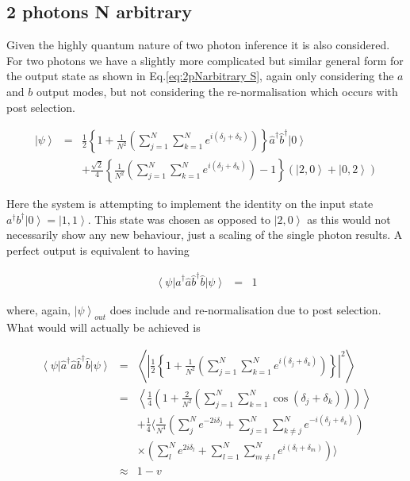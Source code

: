 \documentclass[aps,pra,twocolumn,superscriptaddress,numerical]{revtex4-1}
\begin{document}
	\subsection{2 photons N arbitrary \label{2 photons N arbitrary}}
	
		Given the highly quantum nature of two photon inference it is also considered. For two photons we have a slightly more complicated but similar general form for the output state as shown in Eq.\ref{eq:2pNarbitrary S}, again only considering the $a$ and $b$ output modes, but not considering the re-normalisation which occurs with post selection.
		
		\begin{widetext}
			\begin{eqnarray}
				\left|\psi\right\rangle & = & \frac{1}{2}\left\{ 1+\frac{1}{N^{2}}\left(\sum_{j=1}^{N}\sum_{k=1}^{N}e^{i(\delta_{j}+\delta_{k})}\right)\right\} \hat{a}^{\dagger}\hat{b}^{\dagger}\left|0\right\rangle \nonumber \\
			 	& & +\frac{\sqrt{2}}{4}\left\{ \frac{1}{N^{2}}\left(\sum_{j=1}^{N}\sum_{k=1}^{N}e^{i(\delta_{j}+\delta_{k})}\right)-1\right\} \left(\left|2,0\right\rangle +\left|0,2\right\rangle \right)\label{eq:2pNarbitrary S}
			\end{eqnarray}
		\end{widetext}
		
		Here the system is attempting to implement the identity on the input state $a^{\dagger}b^{\dagger}\left|0\right\rangle =\left|1,1\right\rangle $. This state was chosen as opposed to $\left|2,0\right\rangle $ as this would not necessarily show any new behaviour, just a scaling of the single photon results. A perfect output is equivalent to having
		
		\begin{eqnarray}
			\left\langle \psi\right|\hat{a}^{\dagger}\hat{a}\hat{b}^{\dagger}\hat{b}\left|\psi\right\rangle & = & 1
		\end{eqnarray}
		
		
		where, again, $\left|\psi\right\rangle _{out}$ does include and re-normalisation due to post selection. What would will actually be achieved is
		
		\begin{eqnarray}
			\left\langle \psi\right|\hat{a}^{\dagger}\hat{a}\hat{b}^{\dagger}\hat{b}\left|\psi\right\rangle & = & \left\langle \left|\frac{1}{2}\left\{ 1+\frac{1}{N^{2}}\left(\sum_{j=1}^{N}\sum_{k=1}^{N}e^{i(\delta_{j}+\delta_{k})}\right)\right\} \right|^{2}\right\rangle \nonumber \\
			& = & \left\langle \frac{1}{4}\left(1+\frac{2}{N^{2}}\left(\sum_{j=1}^{N}\sum_{k=1}^{N}\cos\left(\delta_{j}+\delta_{k}\right)\right)\right)\right\rangle \nonumber \\
			&  & +\frac{1}{4}\Biggl\langle\frac{1}{N^{4}}\left(\sum_{j}^{N}e^{-2i\delta_{j}}+\sum_{j=1}^{N}\sum_{k\ne j}^{N}e^{-i(\delta_{j}+\delta_{k})}\right)\nonumber \\
			&  & \times\left(\sum_{l}^{N}e^{2i\delta_{l}}+\sum_{l=1}^{N}\sum_{m\ne l}^{N}e^{i(\delta_{l}+\delta_{m})}\right)\Biggr\rangle\nonumber \\
			& \approx & 1-v\label{eq:exp. value aabb}
		\end{eqnarray}
		
\end{document}
